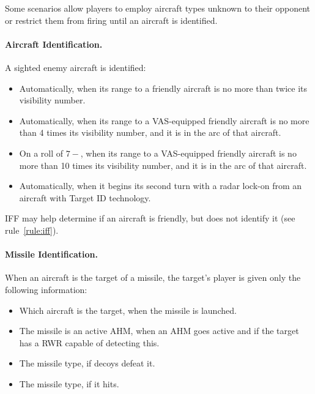 \begin{advancedrules}
{Some scenarios allow players to employ aircraft types unknown to their opponent or restrict them from firing until an aircraft is identified.

\paragraph{Aircraft Identification.} \label{rule:aircraft-identification} A sighted enemy aircraft is identified:

\begin{itemize}

    \item Automatically, when its range to a friendly aircraft is no more than twice its visibility number.

    \item Automatically, when its range to a VAS-equipped friendly aircraft is no more than 4 times its visibility number, and it is in the  arc of that aircraft.

    \item On a roll of $7-$, when its range to a VAS-equipped friendly aircraft is no more than 10 times its visibility number, and it is in the  arc of that aircraft.

    \item Automatically, when it begins its second turn with a radar lock-on from an aircraft with Target ID technology.

\end{itemize}

IFF may help determine if an aircraft is friendly, but does not identify it (see rule~\ref{rule:iff}).

\paragraph{Missile Identification.} 
When an aircraft is the target of a missile, the target's player is given only the following information:


\begin{itemize}
    \item Which aircraft is the target, when the missile is launched.
    \item The missile is an active AHM, when an AHM goes active and if the target has a RWR capable of detecting this.
    \item The missile type, if decoys defeat it.
    \item The missile type, if it hits.
\end{itemize}

}
\end{advancedrules}
